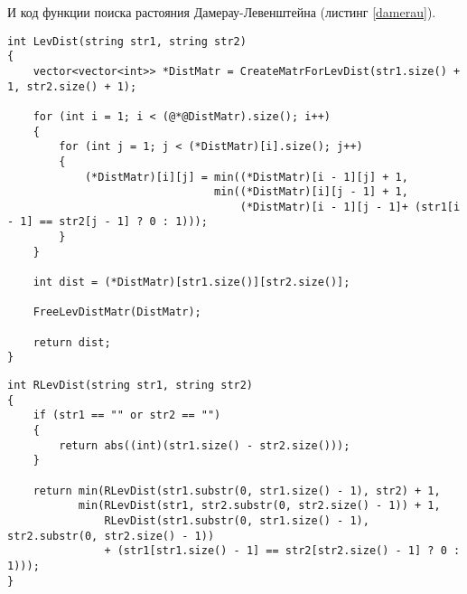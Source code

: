 \documentclass[utf8x, 12pt]{G7-32}
\begin{document}
        И код функции поиска растояния Дамерау-Левенштейна (листинг \ref{damerau}).

\begin{lstlisting}[label=levmatr,caption=Функция нахождения расстояния Левенштейна матрично, escapechar=@]
int LevDist(string str1, string str2)
{
    vector<vector<int>> *DistMatr = CreateMatrForLevDist(str1.size() + 1, str2.size() + 1);

    for (int i = 1; i < (@*@DistMatr).size(); i++)
    {
        for (int j = 1; j < (*DistMatr)[i].size(); j++)
        {
            (*DistMatr)[i][j] = min((*DistMatr)[i - 1][j] + 1,
                                min((*DistMatr)[i][j - 1] + 1,
                                    (*DistMatr)[i - 1][j - 1]+ (str1[i - 1] == str2[j - 1] ? 0 : 1)));
        }
    }

    int dist = (*DistMatr)[str1.size()][str2.size()];

    FreeLevDistMatr(DistMatr);

    return dist;
}
\end{lstlisting}

\newpage
\begin{lstlisting}[label=levrec,caption=Функция нахождения расстояния Левенштейна рекурсивно без матрицы]
int RLevDist(string str1, string str2)
{
    if (str1 == "" or str2 == "")
    {
        return abs((int)(str1.size() - str2.size()));
    }

    return min(RLevDist(str1.substr(0, str1.size() - 1), str2) + 1,
           min(RLevDist(str1, str2.substr(0, str2.size() - 1)) + 1,
               RLevDist(str1.substr(0, str1.size() - 1), str2.substr(0, str2.size() - 1))
               + (str1[str1.size() - 1] == str2[str2.size() - 1] ? 0 : 1)));
}
\end{lstlisting}
\end{document}
